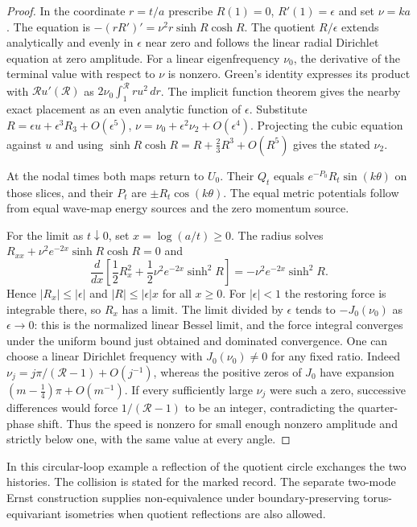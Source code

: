 \begin{proof}
In the coordinate $r=t/a$ prescribe
$R(1)=0$, $R'(1)=\epsilon$ and set $\nu=ka$.
The equation is
$-(rR')'=\nu^2 r\sinh R\cosh R$.
The quotient $R/\epsilon$ extends analytically and
evenly in $\epsilon$ near zero and follows the
linear radial Dirichlet equation at zero amplitude.
For a linear eigenfrequency $\nu_0$, the derivative
of the terminal value with respect to $\nu$ is
nonzero. Green's identity expresses its product
with $\mathcal R u'(\mathcal R)$ as
$2\nu_0\int_1^{\mathcal R}r u^2\,dr$.
The implicit function theorem gives the nearby
exact placement as an even analytic function of
$\epsilon$. Substitute
$R=\epsilon u+\epsilon^3 R_3+O(\epsilon^5)$,
$\nu=\nu_0+\epsilon^2\nu_2+O(\epsilon^4)$.
Projecting the cubic equation against $u$
and using $\sinh R\cosh R=R+\frac23 R^3+O(R^5)$
gives the stated $\nu_2$.

At the nodal times both maps return to $U_0$.
Their $Q_t$ equals $e^{-P_0}R_t\sin(k\theta)$
on those slices, and their $P_t$ are
$\pm R_t\cos(k\theta)$.
The equal metric potentials follow from equal
wave-map energy sources and the zero momentum source.

For the limit as $t\downarrow0$, set
$x=\log(a/t)\ge0$. The radius solves
$R_{xx}+\nu^2e^{-2x}\sinh R\cosh R=0$ and
\[
 \frac{d}{dx}\left[\frac12 R_x^2+
                \frac12\nu^2e^{-2x}\sinh^2R\right]
 =-\nu^2e^{-2x}\sinh^2R .
\]
Hence $|R_x|\le|\epsilon|$ and
$|R|\le|\epsilon|x$ for all $x\ge0$.
For $|\epsilon|<1$ the restoring force is integrable
there, so $R_x$ has a limit.
The limit divided by $\epsilon$ tends to
$-J_0(\nu_0)$ as $\epsilon\to0$: this is the
normalized linear Bessel limit, and the force
integral converges under the uniform bound just
obtained and dominated convergence.
One can choose a linear Dirichlet frequency with
$J_0(\nu_0)\ne0$ for any fixed ratio.
Indeed $\nu_j=j\pi/(\mathcal R-1)+O(j^{-1})$,
whereas the positive zeros of $J_0$ have expansion
$(m-\tfrac14)\pi+O(m^{-1})$.
If every sufficiently large $\nu_j$ were such a zero,
successive differences would force
$1/(\mathcal R-1)$ to be an integer, contradicting
the quarter-phase shift. Thus the speed is nonzero
for small enough nonzero amplitude and strictly
below one, with the same value at every angle.
\end{proof}

In this circular-loop example a reflection of the
quotient circle exchanges the two histories.
The collision is stated for the marked record.
The separate two-mode Ernst construction supplies
non-equivalence under boundary-preserving
torus-equivariant isometries when quotient
reflections are also allowed.
